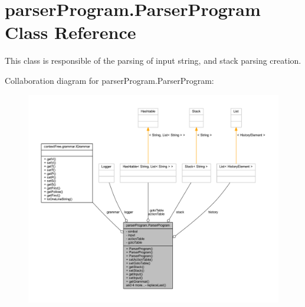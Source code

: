 \hypertarget{classparser_program_1_1_parser_program}{\section{parser\-Program.\-Parser\-Program Class Reference}
\label{classparser_program_1_1_parser_program}
}


This class is responsible of the parsing of input string, and stack parsing creation.  




Collaboration diagram for parser\-Program.\-Parser\-Program\-:\nopagebreak
\begin{figure}[H]
\begin{center}
\leavevmode
\includegraphics[width=350pt]{classparser_program_1_1_parser_program__coll__graph}
\end{center}
\end{figure}
